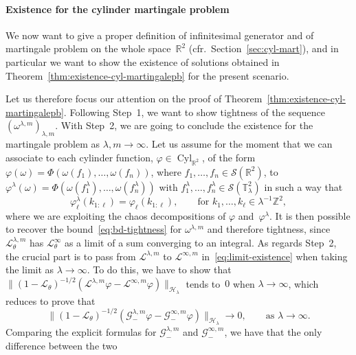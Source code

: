 \documentclass[10pt]{article}
\newcommand{\tmop}[1]{\ensuremath{\operatorname{#1}}}
\begin{document}
\paragraph{Existence for the cylinder martingale problem}We now want to give a
proper definition of infinitesimal generator and of martingale problem on the
whole space~$\mathbb{R}^2$ (cfr.~Section~\ref{sec:cyl-mart}), and in
particular we want to show the existence of solutions obtained in
Theorem~\ref{thm:existence-cyl-martingalepb} for the present scenario.

Let us therefore focus our attention on the proof of
Theorem~\ref{thm:existence-cyl-martingalepb}. Following Step~1, we want to
show tightness of the sequence $(\omega^{\lambda, m})_{\lambda, m}$. With
Step~2, we are going to conclude the existence for the martingale problem as
$\lambda, m \rightarrow \infty$. Let us assume for the moment that we can
associate to each cylinder function, $\varphi \in \tmop{Cyl}_{\mathbb{R}^2}$,
of the form $\varphi (\omega) = \Phi (\omega (f_1), \ldots, \omega (f_n))$,
where $f_1, \ldots, f_n \in \mathcal{S} (\mathbb{R}^2)$, to $\varphi^{\lambda}
(\omega) = \Phi (\omega (f_1^{\lambda}), \ldots, \omega (f_n^{\lambda}))$ with
$f_1^{\lambda}, \ldots, f^{\lambda}_n \in \mathcal{S}
(\mathbb{T}^2_{\lambda})$ in such a way that
\[ \varphi_{\ell}^{\lambda} (k_{1 : \ell}) = \varphi_{\ell} (k_{1 : \ell}),
   \qquad \text{for } k_1, \ldots, k_{\ell} \in \lambda^{- 1} \mathbb{Z}^2, \]
where we are exploiting the chaos decompositions of $\varphi$
and~$\varphi^{\lambda}$. It is then possible to recover the
bound~{\eqref{eq:bd-tightness}} for $\omega^{\lambda, m}$ and therefore
tightness, since $\mathcal{L}_{\theta}^{\lambda, m}$ has
$\mathcal{L}_{\theta}^{\infty}$ as a limit of a sum converging to an integral.
As regards Step~2, the crucial part is to pass from $\mathcal{L}^{\lambda, m}$
to $\mathcal{L}^{\infty, m}$ in~{\eqref{eq:limit-existence}} when taking the
limit as $\lambda \rightarrow \infty$. To do this, we have to show that $\| (1
-\mathcal{L}_{\theta})^{- 1 / 2} (\mathcal{L}^{\lambda, m} \varphi
-\mathcal{L}^{\infty, m} \varphi) \|_{\mathcal{H}_{\lambda}}$ tends to~$0$
when $\lambda \rightarrow \infty$, which reduces to prove that
\[ \| (1 -\mathcal{L}_{\theta})^{- 1 / 2} (\mathcal{G}_-^{\lambda, m} \varphi
   -\mathcal{G}_-^{\infty, m} \varphi) \|_{\mathcal{H}_{\lambda}} \rightarrow
   0, \qquad \text{as } \lambda \rightarrow \infty . \]
Comparing the explicit formulas for $\mathcal{G}_-^{\lambda, m}$ and
$\mathcal{G}_-^{\infty, m}$, we have that the only difference between the two
\end{document}
